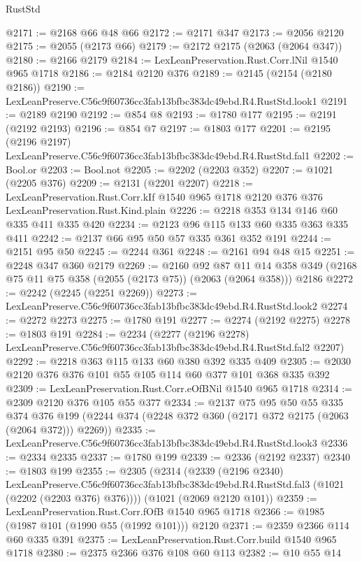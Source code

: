 \begin{lexlean}{RustStd}
\begin{coremodule}
@2171 := @2168 @66 @48 @66
@2172 := @2171 @347
@2173 := @2056 @2120
@2175 := @2055 (@2173 @66)
@2179 := @2172 @2175 (@2063 (@2064 @347))
@2180 := @2166 @2179
@2184 := LexLeanPreservation.Rust.Corr.lNil @1540 @965 @1718
@2186 := @2184 @2120 @376
@2189 := @2145 (@2154 (@2180 @2186))
@2190 := LexLeanPreserve.C56c9f60736cc3fab13bfbc383dc49ebd.R4.RustStd.look1
@2191 := @2189 @2190
@2192 := @854 @8
@2193 := @1780 @177
@2195 := @2191 (@2192 @2193)
@2196 := @854 @7
@2197 := @1803 @177
@2201 := @2195 (@2196 @2197) LexLeanPreserve.C56c9f60736cc3fab13bfbc383dc49ebd.R4.RustStd.fal1
@2202 := Bool.or
@2203 := Bool.not
@2205 := @2202 (@2203 @352)
@2207 := @1021 (@2205 @376)
@2209 := @2131 (@2201 @2207)
@2218 := LexLeanPreservation.Rust.Corr.kIf
    @1540
    @965
    @1718
    @2120
    @376
    @376
    LexLeanPreservation.Rust.Kind.plain
@2226 := @2218 @353 @134 @146 @60 @335 @411 @335 @420
@2234 := @2123 @96 @115 @133 @60 @335 @363 @335 @411
@2242 := @2137 @66 @95 @50 @57 @335 @361 @352 @191
@2244 := @2151 @95 @50
@2245 := @2244 @361
@2248 := @2161 @94 @48 @15
@2251 := @2248 @347 @360 @2179
@2269 := @2160
    @92
    @87
    @11
    @14
    @358
    @349
    (@2168 @75 @11 @75 @358 (@2055 (@2173 @75)) (@2063 (@2064 @358)))
    @2186
@2272 := @2242 (@2245 (@2251 @2269))
@2273 := LexLeanPreserve.C56c9f60736cc3fab13bfbc383dc49ebd.R4.RustStd.look2
@2274 := @2272 @2273
@2275 := @1780 @191
@2277 := @2274 (@2192 @2275)
@2278 := @1803 @191
@2284 := @2234
    (@2277 (@2196 @2278) LexLeanPreserve.C56c9f60736cc3fab13bfbc383dc49ebd.R4.RustStd.fal2 @2207)
@2292 := @2218 @363 @115 @133 @60 @380 @392 @335 @409
@2305 := @2030 @2120 @376 @376 @101 @55 @105 @114 @60 @377 @101 @368 @335 @392
@2309 := LexLeanPreservation.Rust.Corr.eOfBNil @1540 @965 @1718
@2314 := @2309 @2120 @376 @105 @55 @377
@2334 := @2137
    @75
    @95
    @50
    @55
    @335
    @374
    @376
    @199
    (@2244 @374 (@2248 @372 @360 (@2171 @372 @2175 (@2063 (@2064 @372))) @2269))
@2335 := LexLeanPreserve.C56c9f60736cc3fab13bfbc383dc49ebd.R4.RustStd.look3
@2336 := @2334 @2335
@2337 := @1780 @199
@2339 := @2336 (@2192 @2337)
@2340 := @1803 @199
@2355 := @2305
    (@2314
      (@2339
        (@2196 @2340)
        LexLeanPreserve.C56c9f60736cc3fab13bfbc383dc49ebd.R4.RustStd.fal3
        (@1021 (@2202 (@2203 @376) @376))))
    (@1021 (@2069 @2120 @101))
@2359 := LexLeanPreservation.Rust.Corr.fOfB @1540 @965 @1718
@2366 := @1985 (@1987 @101 (@1990 @55 (@1992 @101))) @2120
@2371 := @2359 @2366 @114 @60 @335 @391
@2375 := LexLeanPreservation.Rust.Corr.build @1540 @965 @1718
@2380 := @2375 @2366 @376 @108 @60 @113
@2382 := @10 @55 @14

\end{coremodule}
\end{lexlean}

